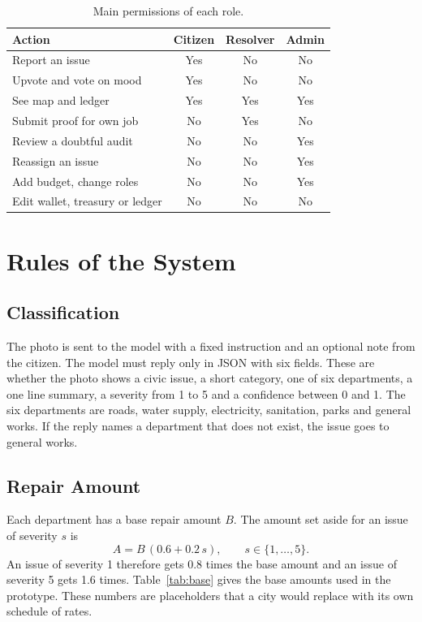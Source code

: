 \documentclass[conference,a4paper]{IEEEtran}
\begin{document}
\begin{table}[!t]\centering\footnotesize
\caption{Main permissions of each role.}\label{tab:roles}
\begin{tabular}{L{3.7cm}ccc}\toprule
\textbf{Action} & \textbf{Citizen} & \textbf{Resolver} & \textbf{Admin}\\\midrule
Report an issue & Yes & No & No\\
Upvote and vote on mood & Yes & No & No\\
See map and ledger & Yes & Yes & Yes\\
Submit proof for own job & No & Yes & No\\
Review a doubtful audit & No & No & Yes\\
Reassign an issue & No & No & Yes\\
Add budget, change roles & No & No & Yes\\
Edit wallet, treasury or ledger & No & No & No\\\bottomrule
\end{tabular}\end{table}

\section{Rules of the System}\label{sec:rules}
\subsection{Classification}
The photo is sent to the model with a fixed instruction and an optional note from the citizen. The model must reply only in JSON with six fields. These are whether the photo shows a civic issue, a short category, one of six departments, a one line summary, a severity from 1 to 5 and a confidence between 0 and 1. The six departments are roads, water supply, electricity, sanitation, parks and general works. If the reply names a department that does not exist, the issue goes to general works.

\subsection{Repair Amount}
Each department has a base repair amount $B$. The amount set aside for an issue of severity $s$ is
\begin{equation}
A = B\,(0.6 + 0.2\,s), \qquad s \in \{1,\dots,5\}.
\end{equation}
An issue of severity 1 therefore gets 0.8 times the base amount and an issue of severity 5 gets 1.6 times. Table~\ref{tab:base} gives the base amounts used in the prototype. These numbers are placeholders that a city would replace with its own schedule of rates.
\end{document}
